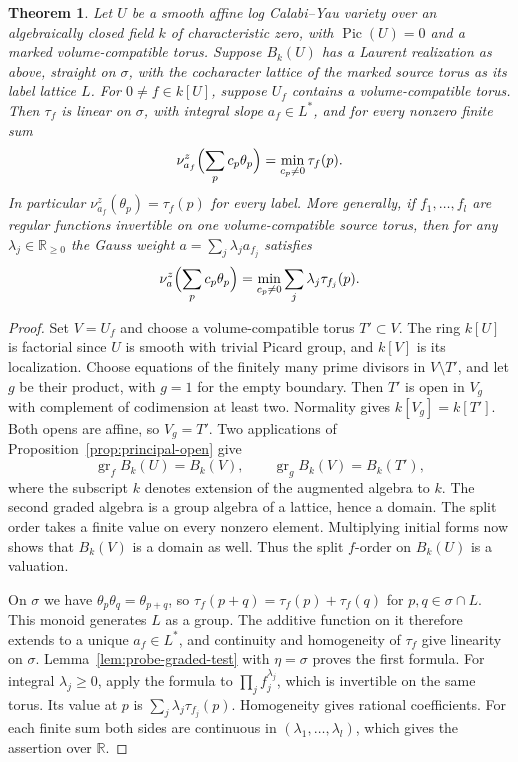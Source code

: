 \documentclass[11pt,reqno]{amsart}
\numberwithin{equation}{section}
\newtheorem{theorem}{Theorem}[section]
\theoremstyle{definition}
\theoremstyle{remark}
\DeclareMathOperator{\Pic}{Pic}
\begin{document}
\begin{theorem}\label{thm:one-sided-probe}
Let \(U\) be a smooth affine log Calabi--Yau variety over an
algebraically closed field \(k\) of characteristic zero, with
\(\Pic (U)=0\) and a marked volume-compatible torus.
Suppose \(B_k(U)\) has a Laurent realization as above, straight
on \(\sigma\), with the cocharacter lattice of the marked source torus
as its label lattice \(L\).
For \(0\ne f\in k[U]\), suppose \(U_f\) contains a volume-compatible
torus. Then \(\tau_f\) is linear on \(\sigma\), with integral slope
\(a_f\in L^*\), and for every nonzero finite sum
\begin{equation}\label{eq:single-function-valuation}
\nu^z_{a_f}\Bigl(\sum_p c_p\theta_p\Bigr) =\min_{c_p\ne0}\tau_f(p).
\end{equation}
In particular \(\nu^z_{a_f}(\theta_p)=\tau_f(p)\) for every label.
More generally, if \(f_1,\ldots,f_l\) are regular functions invertible
on one volume-compatible source torus, then for any
\(\lambda_j\in\mathbb R_{\ge0}\) the Gauss weight
\(a=\sum_j\lambda_j a_{f_j}\) satisfies
\[ \nu^z_a\Bigl(\sum_p c_p\theta_p\Bigr) =\min_{c_p\ne0}\sum_j\lambda_j\tau_{f_j}(p). \]
\end{theorem}
\begin{proof}
Set \(V=U_f\) and choose a volume-compatible torus \(T'\subset V\).
The ring \(k[U]\) is factorial since \(U\) is smooth with trivial
Picard group, and \(k[V]\) is its localization. Choose equations of
the finitely many prime divisors in \(V\setminus T'\), and let \(g\)
be their product, with \(g=1\) for the empty boundary. Then \(T'\)
is open in \(V_g\) with complement of codimension at least two.
Normality gives \(k[V_g]=k[T']\). Both opens are affine, so \(V_g=T'\).
Two applications of Proposition~\ref{prop:principal-open} give
\[ \operatorname{gr}_f B_k(U)=B_k(V),\qquad \operatorname{gr}_g B_k(V)=B_k(T') , \]
where the subscript \(k\) denotes extension of the augmented algebra
to \(k\). The second graded algebra is a group algebra of a lattice,
hence a domain. The split order takes a finite value on every nonzero
element. Multiplying initial forms now shows that \(B_k(V)\) is a
domain as well. Thus the split \(f\)-order on \(B_k(U)\) is a valuation.

On \(\sigma\) we have \(\theta_p\theta_q=\theta_{p+q}\), so
\(\tau_f(p+q)=\tau_f(p)+\tau_f(q)\) for \(p,q\in\sigma\cap L\).
This monoid generates \(L\) as a group. The additive function on it
therefore extends to a unique \(a_f\in L^*\), and continuity and
homogeneity of \(\tau_f\) give linearity on \(\sigma\).
Lemma~\ref{lem:probe-graded-test} with \(\eta=\sigma\) proves the
first formula. For integral \(\lambda_j\ge0\), apply the formula to
\(\prod_j f_j^{\lambda_j}\), which is invertible on the same torus.
Its value at \(p\) is \(\sum_j\lambda_j\tau_{f_j}(p)\).
Homogeneity gives rational coefficients. For each finite sum both
sides are continuous in \((\lambda_1,\ldots,\lambda_l)\), which gives
the assertion over \(\mathbb R\).
\end{proof}
\end{document}
